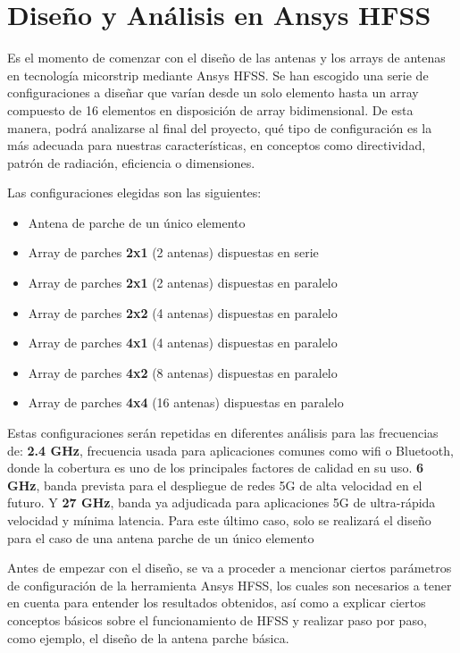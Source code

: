 \section{Diseño y Análisis en Ansys HFSS}

\par Es el momento de comenzar con el diseño de las antenas y los arrays de antenas en tecnología micorstrip mediante Ansys HFSS. Se han escogido una serie de configuraciones a diseñar que varían desde un solo elemento hasta un array compuesto de 16 elementos en disposición de array bidimensional. De esta manera, podrá analizarse al final del proyecto, qué tipo de configuración es la más adecuada para nuestras características, en conceptos como directividad, patrón de radiación, eficiencia o dimensiones.
\\
\par Las configuraciones elegidas son las siguientes:

\begin{itemize}
\item Antena de parche de un único elemento
\item Array de parches \textbf{2x1} (2 antenas) dispuestas en serie
\item Array de parches \textbf{2x1} (2 antenas) dispuestas en paralelo
\item Array de parches \textbf{2x2} (4 antenas) dispuestas en paralelo
\item Array de parches \textbf{4x1} (4 antenas) dispuestas en paralelo
\item Array de parches \textbf{4x2} (8 antenas) dispuestas en paralelo
\item Array de parches \textbf{4x4} (16 antenas) dispuestas en paralelo
\end{itemize}

\par Estas configuraciones serán repetidas en diferentes análisis para las frecuencias de: \textbf{2.4 GHz}, frecuencia usada para aplicaciones comunes como \gls{wifi} o Bluetooth, donde la cobertura es uno de los principales factores de calidad en su uso. \textbf{6 GHz}, banda prevista para el despliegue de redes 5G de alta velocidad en el futuro. Y \textbf{27 GHz}, banda ya adjudicada para aplicaciones 5G de ultra-rápida velocidad y mínima latencia. Para este último caso, solo se realizará el diseño para el caso de una antena parche de un único elemento 
\\
\par Antes de empezar con el diseño, se va a proceder a mencionar ciertos parámetros de configuración de la herramienta Ansys HFSS, los cuales son necesarios a tener en cuenta para entender los resultados obtenidos, así como a explicar ciertos conceptos básicos sobre el funcionamiento de HFSS y realizar paso por paso, como ejemplo, el diseño de la antena parche básica.

